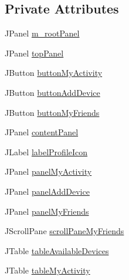 \subsection*{Private Attributes}
\begin{DoxyCompactItemize}
\item 
J\+Panel \mbox{\hyperlink{classcom_1_1activitytracker_1_1_main_window_ac3d61c032aef87f12b1ae6f7dbf482c3}{m\+\_\+root\+Panel}}
\item 
J\+Panel \mbox{\hyperlink{classcom_1_1activitytracker_1_1_main_window_a6baf76b2b8ede1ba82fc6d096ddb580b}{top\+Panel}}
\item 
J\+Button \mbox{\hyperlink{classcom_1_1activitytracker_1_1_main_window_adec15801f8e16f769bd954e351a663fa}{button\+My\+Activity}}
\item 
J\+Button \mbox{\hyperlink{classcom_1_1activitytracker_1_1_main_window_af241d0ee8023ed099caa204419d74ccb}{button\+Add\+Device}}
\item 
J\+Button \mbox{\hyperlink{classcom_1_1activitytracker_1_1_main_window_a4d9543db1723fd7d1921f07cc92e2abb}{button\+My\+Friends}}
\item 
J\+Panel \mbox{\hyperlink{classcom_1_1activitytracker_1_1_main_window_aaa5ce3b10bff65231c65a3d4b33724b0}{content\+Panel}}
\item 
J\+Label \mbox{\hyperlink{classcom_1_1activitytracker_1_1_main_window_a05a555ba49d30b00573d07e5acd39e0a}{label\+Profile\+Icon}}
\item 
J\+Panel \mbox{\hyperlink{classcom_1_1activitytracker_1_1_main_window_a89833c824727a496f4a889177d4d3f3c}{panel\+My\+Activity}}
\item 
J\+Panel \mbox{\hyperlink{classcom_1_1activitytracker_1_1_main_window_a02f203d3c00a61d838fcee4657984584}{panel\+Add\+Device}}
\item 
J\+Panel \mbox{\hyperlink{classcom_1_1activitytracker_1_1_main_window_afc5efa70337b4b072b38c2cc30991473}{panel\+My\+Friends}}
\item 
J\+Scroll\+Pane \mbox{\hyperlink{classcom_1_1activitytracker_1_1_main_window_a4ef571b624e78e91f3ccad9234c0b5d3}{scroll\+Pane\+My\+Friends}}
\item 
J\+Table \mbox{\hyperlink{classcom_1_1activitytracker_1_1_main_window_a50012386053e035e7ae0fb993153b225}{table\+Available\+Devices}}
\item 
J\+Table \mbox{\hyperlink{classcom_1_1activitytracker_1_1_main_window_a0ad6d3ca1298275eba15a9ea189d4d9b}{table\+My\+Activity}}
\end{DoxyCompactItemize}


